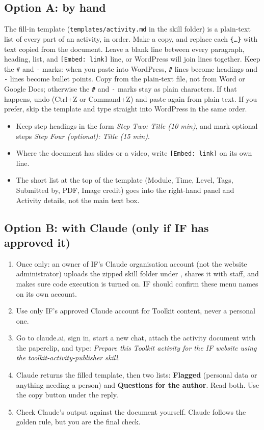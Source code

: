 \subsection*{Option A: by hand}
The fill-in template (\texttt{templates/activity.md} in the skill folder) is a plain-text list of every part of an activity, in order. Make a copy, and replace each \texttt{\{\ldots\}} with text copied from the document. Leave a blank line between every paragraph, heading, list, and \texttt{[Embed: link]} line, or WordPress will join lines together. Keep the \texttt{\#} and \texttt{-} marks: when you paste into WordPress, \texttt{\#} lines become headings and \texttt{-} lines become bullet points. Copy from the plain-text file, not from Word or Google Docs; otherwise the \texttt{\#} and \texttt{-} marks stay as plain characters. If that happens, undo (Ctrl+Z or Command+Z) and paste again from plain text. If you prefer, skip the template and type straight into WordPress in the same order.
\begin{itemize}
  \item Keep step headings in the form \textit{Step Two: Title (10 min)}, and mark optional steps \textit{Step Four (optional): Title (15 min)}.
  \item Where the document has slides or a video, write \texttt{[Embed: link]} on its own line.
  \item The short list at the top of the template (Module, Time, Level, Tags, Submitted by, PDF, Image credit) goes into the right-hand panel and Activity details, not the main text box.
\end{itemize}

\subsection*{Option B: with Claude (only if IF has approved it)}
\begin{enumerate}
  \item Once only: an owner of IF's Claude organisation account (not the website administrator) uploads the zipped skill folder under , shares it with staff, and makes sure code execution is turned on. IF should confirm these menu names on its own account.
  \item Use only IF's approved Claude account for Toolkit content, never a personal one.
  \item Go to claude.ai, sign in, start a new chat, attach the activity document with the paperclip, and type: \textit{Prepare this Toolkit activity for the IF website using the toolkit-activity-publisher skill.}
  \item Claude returns the filled template, then two lists: \textbf{Flagged} (personal data or anything needing a person) and \textbf{Questions for the author}. Read both. Use the copy button under the reply.
  \item Check Claude's output against the document yourself. Claude follows the golden rule, but you are the final check.
\end{enumerate}

